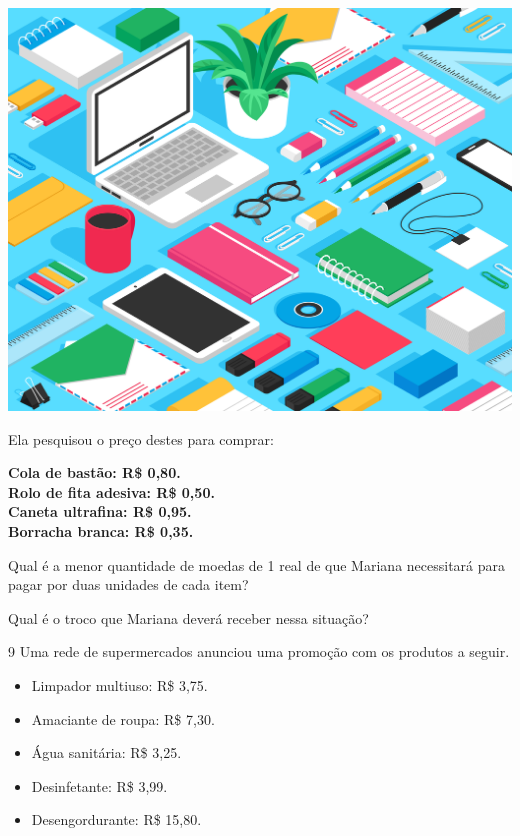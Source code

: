 \begin{center}
\includegraphics[width=\textwidth]{media/image37d.jpeg}
\end{center}

Ela pesquisou o preço destes para comprar:

\begin{myquote}\textbf{
 Cola de bastão: R\$ 0,80.\\
 Rolo de fita adesiva: R\$ 0,50.\\
 Caneta ultrafina: R\$ 0,95.\\
 Borracha branca: R\$ 0,35.}
\end{myquote}

\begin{escolha}
\item
  Qual é a menor quantidade de moedas de 1 real de que Mariana necessitará para
  pagar por duas unidades de cada item?\\

\item
  Qual é o troco que Mariana deverá receber nessa situação?\\
\end{escolha}

\num{9} Uma rede de supermercados anunciou uma promoção com os produtos a seguir.

\begin{mdframed}[linewidth=2pt,linecolor=azul!20,backgroundcolor=azul!20,roundcorner=2pt]
\begin{itemize}
  \item Limpador multiuso: R\$ 3,75.
  \item Amaciante de roupa: R\$ 7,30.
  \item Água sanitária: R\$ 3,25.
  \item Desinfetante: R\$ 3,99.
  \item Desengordurante: R\$ 15,80.
\end{itemize}
\end{mdframed}

